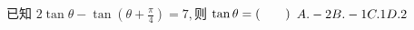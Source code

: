 \documentclass[class=ctexart,crop=false]{standalone}
\begin{document}
已知 $2\tan \theta-\tan(\theta+\frac{\pi}{4})=7,
$则 $\tan \theta=\hfill (\qquad)\\$
$A. -2\hfill B. -1\hfill C. 1\hfill D. 2\hfill$
\end{document}
